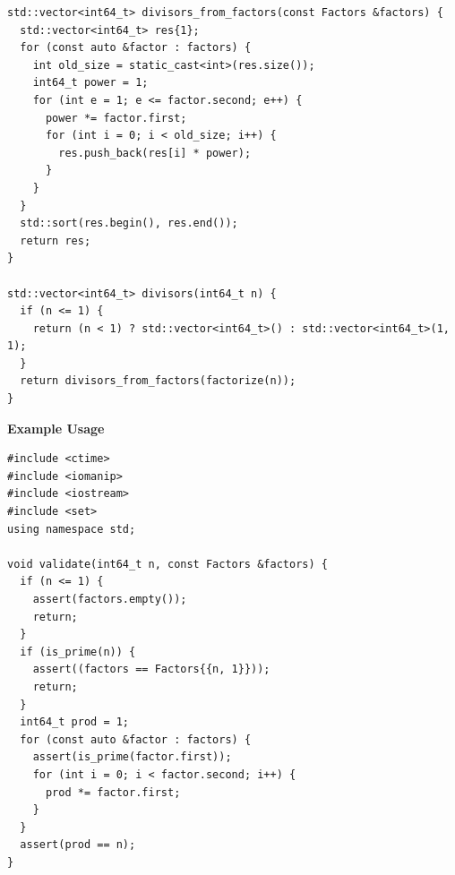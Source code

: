 \begin{lstlisting}[style=cpp]
std::vector<int64_t> divisors_from_factors(const Factors &factors) {
  std::vector<int64_t> res{1};
  for (const auto &factor : factors) {
    int old_size = static_cast<int>(res.size());
    int64_t power = 1;
    for (int e = 1; e <= factor.second; e++) {
      power *= factor.first;
      for (int i = 0; i < old_size; i++) {
        res.push_back(res[i] * power);
      }
    }
  }
  std::sort(res.begin(), res.end());
  return res;
}

std::vector<int64_t> divisors(int64_t n) {
  if (n <= 1) {
    return (n < 1) ? std::vector<int64_t>() : std::vector<int64_t>(1, 1);
  }
  return divisors_from_factors(factorize(n));
}
\end{lstlisting}
\textbf{Example Usage}\par
\begin{lstlisting}[style=cpp]
#include <ctime>
#include <iomanip>
#include <iostream>
#include <set>
using namespace std;

void validate(int64_t n, const Factors &factors) {
  if (n <= 1) {
    assert(factors.empty());
    return;
  }
  if (is_prime(n)) {
    assert((factors == Factors{{n, 1}}));
    return;
  }
  int64_t prod = 1;
  for (const auto &factor : factors) {
    assert(is_prime(factor.first));
    for (int i = 0; i < factor.second; i++) {
      prod *= factor.first;
    }
  }
  assert(prod == n);
}


\end{lstlisting}

